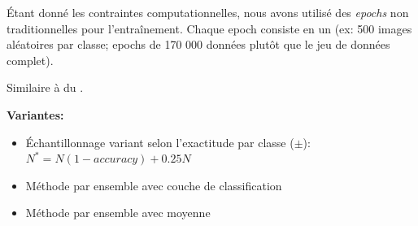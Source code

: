 Étant donné les contraintes computationnelles, nous avons utilisé des \emph{epochs} non traditionnelles pour l'entraînement. 
Chaque epoch consiste en un  (ex: 500 images aléatoires par classe; epochs de 170 000 données plutôt que le jeu de données complet).

Similaire à du  .


\textbf{Variantes:}

\begin{itemize}
\item Échantillonnage variant selon l'exactitude par classe ($\pm$): $N^*=N(1-accuracy) +0.25N$
\item Méthode par ensemble avec couche de classification
\item Méthode par ensemble avec moyenne
\end{itemize}